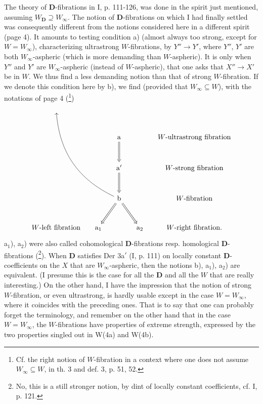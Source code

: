 \documentclass[11pt]{article}
\newcommand{\printedpage}[1]{\marginpar{\footnotesize p.~#1}}
\newcommand{\msp}[1]{\marginpar{\footnotesize [#1]}}
\begin{document}
The theory of \textbf{D}-fibrations in I, p. 111-126, was done in the spirit just mentioned, assuming $W_{\mathbf{D}} \supseteq W_\infty$. The notion of \textbf{D}-fibrations on which I had finally settled was consequently different from the notions considered here in a different spirit (page 4). It amounts to testing condition a) (almost always too strong, except for $W = W_\infty$), characterizing ultrastrong $W$-fibrations, by $Y'' \longrightarrow Y'$, where $Y''$, $Y'$ are both $W_\infty$-aspheric (which is more demanding than $W$-aspheric). It is only when $Y''$ and $Y'$ are $W_\infty$-aspheric (instead of $W$-aspheric), that one asks that $X'' \longrightarrow X'$ be in $W$. We thus find\msp{page 19} a less demanding notion than that of strong $W$-fibration. If we denote this condition here by b), we find (provided that $W_\infty \subseteq W$), with the notations of page 4 (\footnote[39]{Cf. the right notion of $W$-fibration in a context where one does not assume $W_\infty \subseteq W$, in th. 3 and def. 3, p. 51, 52.}) %
\[
\begin{tikzcd}[column sep=small, row sep=large]
{} & & & & \\
& & \mathrm{a} \arrow[d, Rightarrow] & & W\text{-ultrastrong fibration} \\
& & \mathrm{a}' \arrow[d, Rightarrow] & & W\text{-strong fibration} \\
& & \mathrm{b} \arrow[dl, Rightarrow] \arrow[dr, Rightarrow] \arrow[uuull, bend left=30] & & W\text{-fibration} \\
W\text{-left fibration} & \mathrm{a}_1 & & \mathrm{a}_2 & W\text{-right fibration.}
\end{tikzcd}
\]
a$_1$), a$_2$) were also called cohomological \textbf{D}-fibrations resp. homological \textbf{D}-fibrations (\footnote[40]{No, this is a still stronger notion, by dint of locally constant coefficients, cf. I, p. 121.}). When \textbf{D} satisfies Der 3a$'$ (I, p. 111) on locally constant \textbf{D}-coefficients on the $X$ that are $W_\infty$-aspheric, then the notions b), a$_1$), a$_2$) are equivalent. (I presume this is the case for all the \textbf{D} and all the $W$ that are really interesting.) On the other hand, I have the impression that the notion of strong $W$-fibration, or even ultrastrong, is hardly usable except in the case $W = W_\infty$, where it coincides with the preceding ones. That is to say that one can probably forget the terminology, and remember on the other hand that in the case $W = W_\infty$, the %
\printedpage{17}
$W$-fibrations have properties of extreme strength, expressed by the two properties singled out in W(4a) and W(4b).
\end{document}
